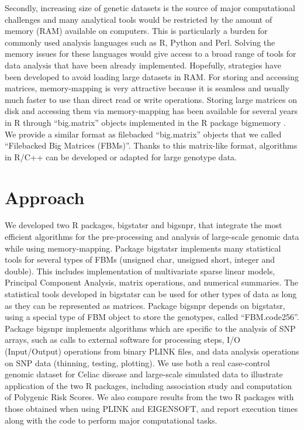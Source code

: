 \documentclass{bioinfo}
\begin{document}
Secondly, increasing size of genetic datasets is the source of major computational challenges and many analytical tools would be restricted by the amount of memory (RAM) available on computers. This is particularly a burden for commonly used analysis languages such as R, Python and Perl. Solving the memory issues for these languages would give access to a broad range of tools for data analysis that have been already implemented. Hopefully, strategies have been developed to avoid loading large datasets in RAM. For storing and accessing matrices, memory-mapping is very attractive because it is seamless and usually much faster to use than direct read or write operations. Storing large matrices on disk and accessing them via memory-mapping has been available for several years in R through ``big.matrix'' objects implemented in the R package bigmemory \cite[]{Kane2013}. 
We provide a similar format as filebacked ``big.matrix'' objects that we called ``Filebacked Big Matrices (FBMs)''.
Thanks to this matrix-like format, algorithms in R/C++ can be developed or adapted for large genotype data. 


\section{Approach}

We developed two R packages, bigstatsr and bigsnpr, that integrate the most efficient algorithms for the pre-processing and analysis of large-scale genomic data while using memory-mapping. Package bigstatsr implements many statistical tools for several types of FBMs (unsigned char, unsigned short, integer and double). This includes implementation of multivariate sparse linear models, Principal Component Analysis, matrix operations, and numerical summaries. The statistical tools developed in bigstatsr can be used for other types of data as long as they can be represented as matrices. Package bigsnpr depends on bigstatsr, using a special type of FBM object to store the genotypes, called ``FBM.code256''. Package bigsnpr implements algorithms which are specific to the analysis of SNP arrays, such as calls to external software for processing steps, I/O (Input/Output) operations from binary PLINK files, and data analysis operations on SNP data (thinning, testing, plotting). 
We use both a real case-control genomic dataset for Celiac disease and large-scale simulated data to illustrate application of the two R packages, including association study and computation of Polygenic Risk Scores. We also compare results from the two R packages with those obtained when using PLINK and EIGENSOFT, and report execution times along with the code to perform major computational tasks.
\end{document}
